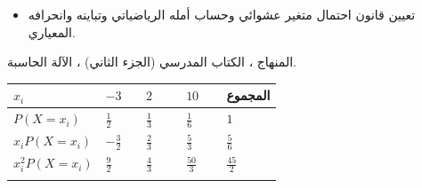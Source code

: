 \documentclass[12pt,a4paper]{article}
\newenvironment{LTR}{\begin{otherlanguage}{english}}{\end{otherlanguage}}
\newcommand{\ar}[1]{\foreignlanguage{arabic}{#1}}
\newcommand{\Phase}[1]{\textbf{#1}}
\newenvironment{Sayr}{%
\begin{LTR}\renewcommand{\arraystretch}{1.25}\setlength{\tabcolsep}{4pt}\relpenalty=10000\binoppenalty=10000\tolerance=9000\emergencystretch=0.3\linewidth
\begin{longtable}{|p{0.09\textwidth}|>{\centering\arraybackslash}p{0.05\textwidth}|p{0.71\textwidth}|>{\centering\arraybackslash}p{0.09\textwidth}|}
\hline\rowcolor{cThm!12}\ar{\footnotesize\textbf{توجيهات وتعاليق}} & \ar{\footnotesize\textbf{المدة}} & \ar{\textbf{سير الحصة}} & \ar{\footnotesize\textbf{مراحل الحصة}}\\\hline\endhead
\hline\endfoot}{\end{longtable}\end{LTR}}
\newcommand{\RaggedEnd}{\leftskip=0pt plus 1fil\relax}
\newcommand{\Row}[4]{\ar{\small #4} & \ar{#3} & \ar{\RaggedEnd #2} & \cellcolor{cThm!8}\ar{\Phase{#1}}\\\hline}
\newcommand{\Lab}[2]{\foreignlanguage{english}{\tcbox[on line,colback=#1,colframe=#1,boxrule=0pt,arc=2pt,boxsep=1pt,left=5pt,right=5pt,top=1pt,bottom=1pt]{\ar{\textcolor{white}{\textbf{#2}}}}}}
\newcommand{\RR}[1]{\ifmmode{\color{cThm}#1}\else$\mbox{\color{cThm}#1}$\fi}
\begin{document}
{\begin{itemize}\item تعيين قانون احتمال متغير عشوائي وحساب أمله الرياضياتي وتباينه وانحرافه المعياري.\end{itemize}}%
{المنهاج ، الكتاب المدرسي (الجزء الثاني) ، الآلة الحاسبة.}
\begin{Sayr}
\Row{مرحلة الانطلاق}{%
\textbf{التهيئة النفسية:} لعبة بالنرد: هل هي مربحة للاعب؟ كيف نقرر؟}{10 د}{وضعية لعب.}
\Row{التشخيص والاكتشاف}{%
\Lab{cEx}{نشاط رقم 02}\ نرمي نردًا متوازنًا: يربح اللاعب $10$ DA إذا ظهر $6$ ، و $2$ DA إذا ظهر $4$ أو $5$ ، ويخسر $3$ DA في الحالات الأخرى. $X$ الربح الجبري.\par\textbf{(1)} ما القيم الممكنة لـ $X$ ؟\par\textbf{(2)} عيّن قانون احتمال $X$.\par\textbf{(3)} احسب «متوسط الربح» في رمية واحدة.}{35 د}{جدول القانون.}
\Row{}{%
\Lab{cDef}{مناقشة النشاط}\par\textbf{(1)} $X\in\{\RR{-3;2;10}\}$.\par\textbf{(2)} $P(X=-3)=\dfrac36=\RR{\dfrac12}$ (الأرقام $1$ ، $2$ ، $3$).\par\textbf{(3)} $P(X=2)=\dfrac26=\RR{\dfrac13}$ (الرقمان $4$ ، $5$) ؛ \quad $P(X=10)=\RR{\dfrac16}$.\par\textbf{(4)} الجدول (عمود المجموع للتحقق):\par\smallskip\begin{LTR}\centering{\renewcommand{\arraystretch}{1.45}\setlength{\tabcolsep}{2pt}\begin{tabular}{|>{\centering\arraybackslash}p{0.260\linewidth}|>{\centering\arraybackslash}p{0.150\linewidth}|>{\centering\arraybackslash}p{0.150\linewidth}|>{\centering\arraybackslash}p{0.150\linewidth}|>{\centering\arraybackslash}p{0.150\linewidth}|}\hline\rowcolor{cSec!12}$x_i$ & $-3$ & $2$ & $10$ & \ar{المجموع}\\\hline $P(X=x_i)$ & $\frac12$ & $\frac13$ & $\frac16$ & $1$\\\hline $x_iP(X=x_i)$ & $-\frac32$ & $\frac23$ & $\frac53$ & \textcolor{cThm}{$\frac56$}\\\hline $x_i^2P(X=x_i)$ & $\frac92$ & $\frac43$ & $\frac{50}3$ & \textcolor{cThm}{$\frac{45}2$}\\\hline \end{tabular}}\end{LTR}\par \par\textbf{(5)} $E(X)=-\dfrac32+\dfrac23+\dfrac53=\RR{\dfrac56}\approx0{,}83$ DA $>0$: اللعبة \RR{في} \RR{صالح} \RR{اللاعب}.}{}{}

\end{Sayr}
\end{document}
